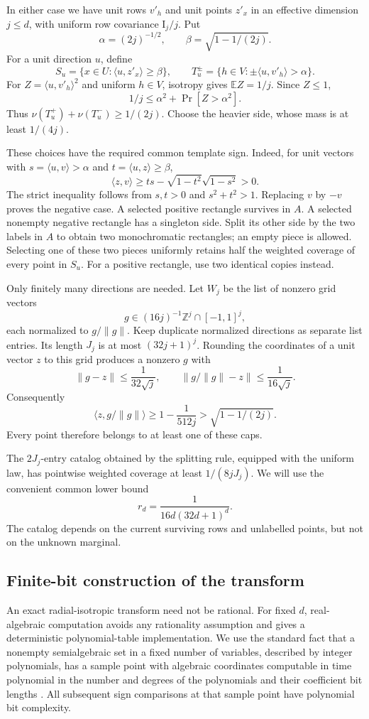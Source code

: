 \documentclass[11pt,letterpaper,pmlr,twoside]{jmlr}
\newcommand{\E}{\mathbb E}
\newcommand{\ip}[2]{\langle #1,#2\rangle}
\newcommand{\norm}[1]{\lVert #1\rVert}
\newcommand{\Id}{\mathrm I}
\begin{document}
In either case we have unit rows $v'_h$ and unit points $z'_x$ in an effective dimension $j\le d$, with uniform row covariance $\Id_j/j$. Put
\[
 \alpha=(2j)^{-1/2},\qquad \beta=\sqrt{1-1/(2j)}.
\]
For a unit direction $u$, define
\[
 S_u=\{x\in U:\ip{u}{z'_x}\ge\beta\},\qquad
 T_u^\pm=\{h\in V:\pm\ip{u}{v'_h}>\alpha\}.
\]
For $Z=\ip{u}{v'_h}^2$ and uniform $h\in V$, isotropy gives $\E Z=1/j$. Since $Z\le1$,
\[
 1/j\le\alpha^2+\Pr[Z>\alpha^2].
\]
Thus $\nu(T_u^+)+\nu(T_u^-)\ge1/(2j)$. Choose the heavier side, whose mass is at least $1/(4j)$.

These choices have the required common template sign. Indeed, for unit vectors with $s=\ip{u}{v}>\alpha$ and $t=\ip{u}{z}\ge\beta$,
\[
 \ip{z}{v}\ge ts-\sqrt{1-t^2}\sqrt{1-s^2}>0.
\]
The strict inequality follows from $s,t>0$ and $s^2+t^2>1$. Replacing $v$ by $-v$ proves the negative case. A selected positive rectangle survives in $A$. A selected nonempty negative rectangle has a singleton side. Split its other side by the two labels in $A$ to obtain two monochromatic rectangles; an empty piece is allowed. Selecting one of these two pieces uniformly retains half the weighted coverage of every point in $S_u$. For a positive rectangle, use two identical copies instead.

Only finitely many directions are needed. Let $W_j$ be the list of nonzero grid vectors
\[
 g\in(16j)^{-1}\mathbb Z^j\cap[-1,1]^j,
\]
each normalized to $g/\norm g$. Keep duplicate normalized directions as separate list entries. Its length $J_j$ is at most $(32j+1)^j$. Rounding the coordinates of a unit vector $z$ to this grid produces a nonzero $g$ with
\[
 \norm{g-z}\le\frac1{32\sqrt j},\qquad
 \norm{g/\norm g-z}\le\frac1{16\sqrt j}.
\]
Consequently
\[
 \ip{z}{g/\norm g}\ge1-\frac1{512j}
 >\sqrt{1-1/(2j)}.
\]
Every point therefore belongs to at least one of these caps.

The $2J_j$-entry catalog obtained by the splitting rule, equipped with the uniform law, has pointwise weighted coverage at least $1/(8jJ_j)$. We will use the convenient common lower bound
\begin{equation}
 r_d=\frac1{16d(32d+1)^d}.
\label{eq:catalogr}
\end{equation}
The catalog depends on the current surviving rows and unlabelled points, but not on the unknown marginal.

\subsection{Finite-bit construction of the transform}
An exact radial-isotropic transform need not be rational. For fixed $d$, real-algebraic computation avoids any rationality assumption and gives a deterministic polynomial-table implementation. We use the standard fact that a nonempty semialgebraic set in a fixed number of variables, described by integer polynomials, has a sample point with algebraic coordinates computable in time polynomial in the number and degrees of the polynomials and their coefficient bit lengths \citep{BPR06}. All subsequent sign comparisons at that sample point have polynomial bit complexity.
\end{document}
